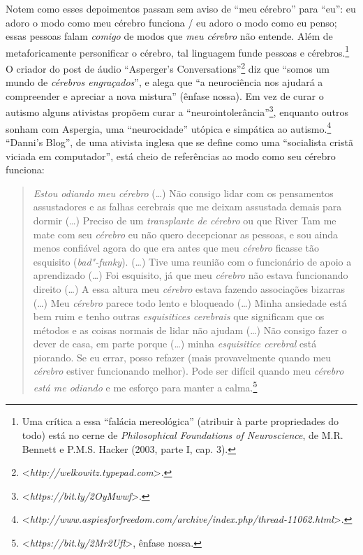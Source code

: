 Notem como esses depoimentos passam sem aviso de ``meu cérebro'' para
``eu'': eu adoro o modo como meu cérebro funciona / eu adoro o modo como
eu penso; essas pessoas falam \emph{comigo} de modos que \emph{meu
cérebro} não entende. Além de metaforicamente personificar o cérebro,
tal linguagem funde pessoas e cérebros.\footnote[22]{Uma crítica a essa ``falácia mereológica'' (atribuir à parte
propriedades do todo) está no cerne de \emph{Philosophical Foundations
of Neuroscience}, de M.R. Bennett e P.M.S. Hacker (2003, parte I, cap.
3).} O criador do
post de áudio ``Asperger's Conversations''\footnote[23]{\textless{}\emph{http://welkowitz.typepad.com}\textgreater{}.} diz que
``somos um mundo de \emph{cérebros engraçados}'', e alega que ``a
neurociência nos ajudará a compreender e apreciar a nova mistura''
(ênfase nossa). Em vez de curar o autismo alguns ativistas propõem curar
a ``neurointolerância''\footnote[24]{\textless{}\emph{https://bit.ly/2OyMwwf}\textgreater{}.}, enquanto outros sonham com
Aspergia, uma ``neurocidade'' utópica e simpática ao
autismo.\footnote[25]{\textless{}\emph{http://www.aspiesforfreedom.com/archive/index.php/thread-11062.html}\textgreater{}.} ``Danni's Blog'', de uma ativista inglesa
que se define como uma ``socialista cristã viciada em computador'', está
cheio de referências ao modo como seu cérebro funciona:

\begin{quote}
\emph{Estou odiando meu cérebro} (\ldots{}) Não consigo lidar com os
pensamentos assustadores e as falhas cerebrais que me deixam assustada
demais para dormir (\ldots{}) Preciso de um \emph{transplante de cérebro} ou
que River Tam me mate com seu \emph{cérebro} eu não quero decepcionar as
pessoas, e sou ainda menos confiável agora do que era antes que meu
\emph{cérebro} ficasse tão esquisito (\emph{bad"-funky}). (\ldots{}) Tive uma
reunião com o funcionário de apoio a aprendizado (\ldots{}) Foi esquisito, já
que meu \emph{cérebro} não estava funcionando direito (\ldots{}) A essa
altura meu \emph{cérebro} estava fazendo associações bizarras (\ldots{}) Meu
\emph{cérebro} parece todo lento e bloqueado (\ldots{}) Minha ansiedade está
bem ruim e tenho outras \emph{esquisitices cerebrais} que significam que
os métodos e as coisas normais de lidar não ajudam (\ldots{}) Não consigo
fazer o dever de casa, em parte porque (\ldots{}) minha \emph{esquisitice
cerebral} está piorando. Se eu errar, posso refazer (mais provavelmente
quando meu \emph{cérebro} estiver funcionando melhor). Pode ser difícil
quando meu \emph{cérebro está me odiando} e me esforço para manter a
calma.\footnote[26]{\textless{}\emph{https://bit.ly/2Mr2Ufl}\textgreater{}, ênfase nossa.}
\end{quote}

